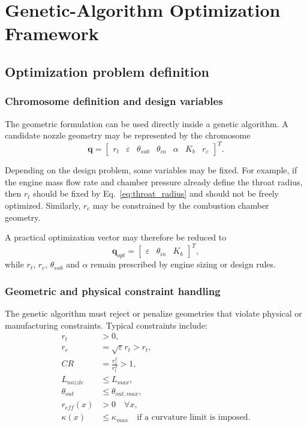 \documentclass[11pt,a4paper]{article}
\begin{document}
\section{Genetic-Algorithm Optimization Framework}

\subsection{Optimization problem definition}

\subsubsection{Chromosome definition and design variables}

The geometric formulation can be used directly inside a genetic algorithm. A candidate nozzle geometry may be represented by the chromosome
\begin{equation}
\bm{q}=\begin{bmatrix}
r_t & \varepsilon & \theta_{sub} & \theta_{in} & \alpha & K_b & r_c
\end{bmatrix}^T.
\label{eq:chromosome}
\end{equation}

Depending on the design problem, some variables may be fixed. For example, if the engine mass flow rate and chamber pressure already define the throat radius, then $r_t$ should be fixed by Eq.~\eqref{eq:throat_radius} and should not be freely optimized. Similarly, $r_c$ may be constrained by the combustion chamber geometry.

A practical optimization vector may therefore be reduced to
\begin{equation}
\bm{q}_{opt}=\begin{bmatrix}
\varepsilon & \theta_{in} & K_b
\end{bmatrix}^T,
\label{eq:chromosome_reduced}
\end{equation}
while $r_t$, $r_c$, $\theta_{sub}$ and $\alpha$ remain prescribed by engine sizing or design rules.

\subsubsection{Geometric and physical constraint handling}

The genetic algorithm must reject or penalize geometries that violate physical or manufacturing constraints. Typical constraints include:
\begin{align}
r_t &>0,\\
r_e &=\sqrt{\varepsilon}r_t>r_t,\\
CR &=\frac{r_c^2}{r_t^2}>1,\\
L_{nozzle} &\leq L_{max},\\
\theta_{out} &\leq \theta_{out,max},\\
r_{eff}(x)&>0 \quad \forall x,\\
\kappa(x)&\leq \kappa_{max} \quad \text{if a curvature limit is imposed.}
\end{align}
\end{document}
